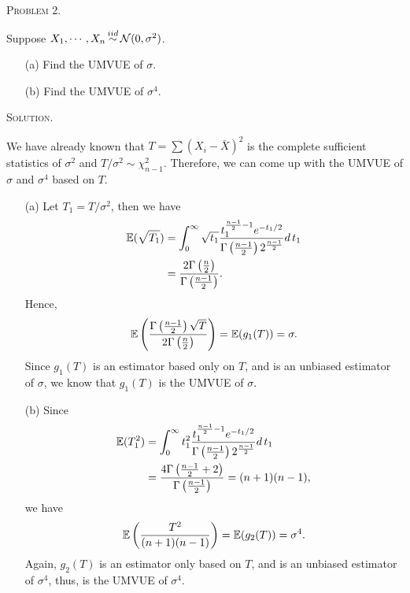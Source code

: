 \documentclass{article}
\begin{document}
\begin{CJK}{UTF8}{gbsn}
    \begin{shaded}
        \noindent\textsc{Problem 2.}\par
        Suppose $X_1, \cdots, X_n \mathop{\sim}\limits^{iid}{\mathcal N} (0, \sigma^2)$.
        \begin{itemize}
            \item [(a)] Find the UMVUE of $\sigma$.
            \item [(b)] Find the UMVUE of $\sigma^4$.
        \end{itemize}
    \end{shaded}
    \noindent\textsc{Solution.}\par
    We have already known that $T=\sum (X_i-\bar{X})^2$ is the complete sufficient statistics of $\sigma^2$ and
    $T/\sigma^2 \sim \chi^2_{n-1}$.
    Therefore, we can come up with the UMVUE of $\sigma$ and $\sigma^4$ based on $T$.
    \begin{itemize}
        \item [(a)] Let $T_1 = T/\sigma^2$, then we have
              \begin{align}
                  {\mathbb E}(\sqrt{T_1}) & = \int_0^{\infty} \sqrt{t_1} \frac{t_1^{\frac{n-1}{2} - 1}e^{-t_1/2}}{\Gamma \left (\frac{n-1}{2}\right )2^{\frac{n-1}{2}}} d \,t_1 \notag \\
                                  & = \frac{2\Gamma\left (\frac{n}{2} \right )}{\Gamma\left (\frac{n-1}{2} \right )}.\notag
              \end{align}
              Hence,
              \begin{align}
                  {\mathbb E} \left (\frac{\Gamma\left (\frac{n-1}{2} \right ) \sqrt{T} }{2 \Gamma\left (\frac{n}{2} \right )} \right ) = {\mathbb E}(g_1(T)) =  \sigma.\notag
              \end{align}
              Since $g_1(T)$ is an estimator based only on $T$, and is an unbiased estimator of $\sigma$,
              we know that $g_1(T)$ is the UMVUE of $\sigma$.
        \item [(b)]
              Since
              \begin{align}
                  {\mathbb E} (T_1^2) & = \int_0^{\infty} t_1^2 \frac{t_1^{\frac{n-1}{2} - 1}e^{-t_1/2}}{\Gamma \left (\frac{n-1}{2}\right )2^{\frac{n-1}{2}}} d \,t_1 \notag \\
                              & = \frac{4\Gamma \left (\frac{n-1}{2} + 2 \right )}{\Gamma\left (\frac{n-1}{2} \right )} = (n+1)(n-1), \notag
              \end{align}
              we have
              \begin{align}
                  {\mathbb E} \left (\frac{T^2}{(n+1)(n-1)} \right ) = {\mathbb E}(g_2(T)) = \sigma^4.\notag
              \end{align}
              Again, $g_2(T)$ is an estimator only based on $T$, and is an unbiased estimator of $\sigma^4$, thus, is the
              UMVUE of $\sigma^4$.
    \end{itemize}




\end{CJK}
\end{document}
